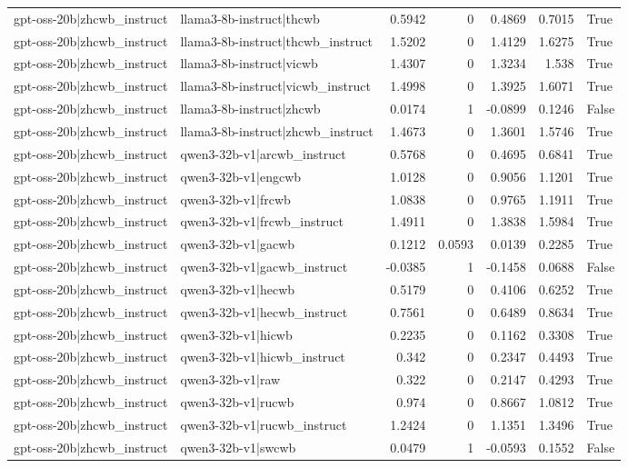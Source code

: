 \begin{table}
\begin{tabular}{l l r r r r l}
gpt-oss-20b|zhcwb_instruct & llama3-8b-instruct|thcwb & 0.5942 & 0 & 0.4869 & 0.7015 & True \\
gpt-oss-20b|zhcwb_instruct & llama3-8b-instruct|thcwb_instruct & 1.5202 & 0 & 1.4129 & 1.6275 & True \\
gpt-oss-20b|zhcwb_instruct & llama3-8b-instruct|vicwb & 1.4307 & 0 & 1.3234 & 1.538 & True \\
gpt-oss-20b|zhcwb_instruct & llama3-8b-instruct|vicwb_instruct & 1.4998 & 0 & 1.3925 & 1.6071 & True \\
gpt-oss-20b|zhcwb_instruct & llama3-8b-instruct|zhcwb & 0.0174 & 1 & -0.0899 & 0.1246 & False \\
gpt-oss-20b|zhcwb_instruct & llama3-8b-instruct|zhcwb_instruct & 1.4673 & 0 & 1.3601 & 1.5746 & True \\
gpt-oss-20b|zhcwb_instruct & qwen3-32b-v1|arcwb_instruct & 0.5768 & 0 & 0.4695 & 0.6841 & True \\
gpt-oss-20b|zhcwb_instruct & qwen3-32b-v1|engcwb & 1.0128 & 0 & 0.9056 & 1.1201 & True \\
gpt-oss-20b|zhcwb_instruct & qwen3-32b-v1|frcwb & 1.0838 & 0 & 0.9765 & 1.1911 & True \\
gpt-oss-20b|zhcwb_instruct & qwen3-32b-v1|frcwb_instruct & 1.4911 & 0 & 1.3838 & 1.5984 & True \\
gpt-oss-20b|zhcwb_instruct & qwen3-32b-v1|gacwb & 0.1212 & 0.0593 & 0.0139 & 0.2285 & True \\
gpt-oss-20b|zhcwb_instruct & qwen3-32b-v1|gacwb_instruct & -0.0385 & 1 & -0.1458 & 0.0688 & False \\
gpt-oss-20b|zhcwb_instruct & qwen3-32b-v1|hecwb & 0.5179 & 0 & 0.4106 & 0.6252 & True \\
gpt-oss-20b|zhcwb_instruct & qwen3-32b-v1|hecwb_instruct & 0.7561 & 0 & 0.6489 & 0.8634 & True \\
gpt-oss-20b|zhcwb_instruct & qwen3-32b-v1|hicwb & 0.2235 & 0 & 0.1162 & 0.3308 & True \\
gpt-oss-20b|zhcwb_instruct & qwen3-32b-v1|hicwb_instruct & 0.342 & 0 & 0.2347 & 0.4493 & True \\
gpt-oss-20b|zhcwb_instruct & qwen3-32b-v1|raw & 0.322 & 0 & 0.2147 & 0.4293 & True \\
gpt-oss-20b|zhcwb_instruct & qwen3-32b-v1|rucwb & 0.974 & 0 & 0.8667 & 1.0812 & True \\
gpt-oss-20b|zhcwb_instruct & qwen3-32b-v1|rucwb_instruct & 1.2424 & 0 & 1.1351 & 1.3496 & True \\
gpt-oss-20b|zhcwb_instruct & qwen3-32b-v1|swcwb & 0.0479 & 1 & -0.0593 & 0.1552 & False \\

\end{tabular}
\end{table}

